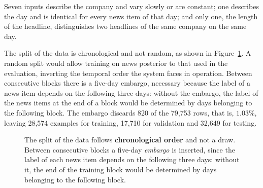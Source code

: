 Seven inputs describe the company and vary slowly or are constant; one describes the day and is
identical for every news item of that day; and only one, the length of the headline, distinguishes
two headlines of the same company on the same day.

The split of the data is chronological and not random, as shown in
Figure~\ref{fig:met_divisao}. A random split would allow training on news posterior to that used in
the evaluation, inverting the temporal order the system faces in operation. Between consecutive
blocks there is a five-day embargo, necessary because the label of a news item depends on the
following three days: without the embargo, the label of the news items at the end of a block would
be determined by days belonging to the following block. The embargo discards 820 of the 79{,}753
rows, that is, $1.03\%$, leaving 28{,}574 examples for training, 17{,}710 for validation and
32{,}649 for testing.

\begin{figure}[htbp]
\centering
{}
\caption[Temporal split with embargo]{The split of the data follows \textbf{chronological order}
and not a draw. Between consecutive blocks a five-day \emph{embargo} is inserted, since the label
of each news item depends on the following three days: without it, the end of the training block
would be determined by days belonging to the following block.}
\label{fig:met_divisao}
\end{figure}

